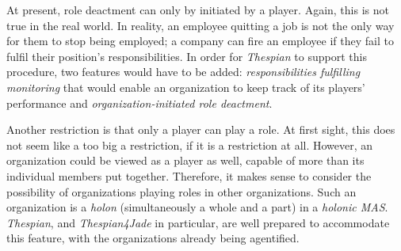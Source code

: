 At present, role deactment can only by initiated by a player.
Again, this is not true in the real world.
In reality, an employee quitting a job is not the only way for them to stop being employed; a company can fire an employee if they fail to fulfil their position's responsibilities.
In order for \textit{Thespian} to support this procedure, two features would have to be added: \textit{responsibilities fulfilling monitoring} that would enable an organization to keep track of its players' performance and \textit{organization-initiated role deactment}.

Another restriction is that only a player can play a role.
At first sight, this does not seem like a too big a restriction, if it is a restriction at all.
However, an organization could be viewed as a player as well, capable of more than its individual members put together.
Therefore, it makes sense to consider the possibility of organizations playing roles in other organizations.
Such an organization is a \textit{holon} (simultaneously a whole and a part) in a \textit{holonic MAS}.
\textit{Thespian}, and \textit{Thespian4Jade} in particular, are well prepared to accommodate this feature, with the organizations already being agentified.